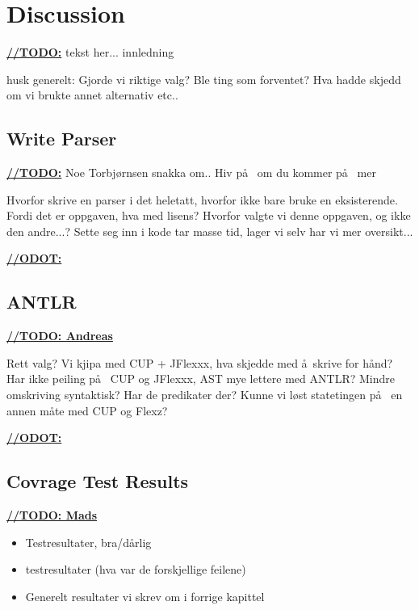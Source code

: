 \chapter{Discussion}
\underline{\textbf{\LARGE //TODO:}} tekst her... innledning


husk generelt: Gjorde vi riktige valg? Ble ting som forventet? Hva hadde skjedd om vi brukte annet alternativ etc..






\section{Write Parser}
\underline{\textbf{\LARGE //TODO:}} Noe Torbj\o rnsen snakka om.. Hiv p\aa~ om du kommer p\aa~ mer

Hvorfor skrive en parser i det heletatt, hvorfor ikke bare bruke en eksisterende. Fordi det er oppgaven, hva med lisens? Hvorfor valgte vi denne oppgaven, og ikke den andre...? Sette seg inn i kode tar masse tid, lager vi selv har vi mer oversikt...

\underline{\textbf{\LARGE //ODOT:}}



\section{ANTLR}
\underline{\textbf{\LARGE //TODO: Andreas}}

Rett valg?
Vi kjipa med CUP + JFlexxx, hva skjedde med \aa~skrive for h\aa nd?
Har ikke peiling p\aa~ CUP og JFlexxx, AST mye lettere med ANTLR? Mindre omskriving syntaktisk? Har de predikater der? Kunne vi l\o st statetingen p\aa~ en annen m\aa te med CUP og Flexz? 

\underline{\textbf{\LARGE //ODOT:}}




\section{Covrage Test Results}

\underline{\textbf{\LARGE //TODO: Mads}}
\begin{itemize}
\item Testresultater, bra/d\aa rlig
\item testresultater (hva var de forskjellige feilene)
\item Generelt resultater vi skrev om i forrige kapittel
\end{itemize}

